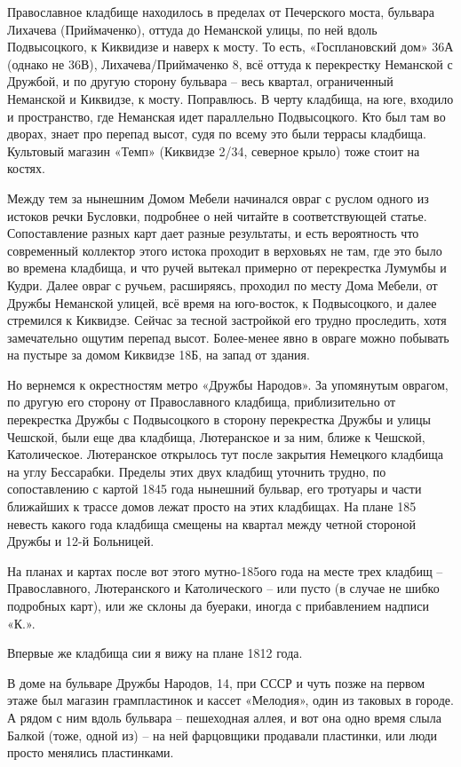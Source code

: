Православное кладбище находилось в пределах от Печерского моста, бульвара Лихачева (Приймаченко), оттуда до Неманской улицы, по ней вдоль Подвысоцкого, к Киквидизе и наверх к мосту. То есть, «Госплановский дом» 36А (однако не 36В), Лихачева/Приймаченко 8, всё оттуда к перекрестку Неманской с Дружбой, и по другую сторону бульвара – весь квартал, ограниченный Неманской и Киквидзе, к мосту. Поправлюсь. В черту кладбища, на юге, входило и пространство, где Неманская идет параллельно Подвысоцкого. Кто был там во дворах, знает про перепад высот, судя по всему это были террасы кладбища. Культовый магазин «Темп» (Киквидзе 2/34, северное крыло) тоже стоит на костях.

Между тем за нынешним Домом Мебели начинался овраг с руслом одного из истоков речки Бусловки, подробнее о ней читайте в соответствующей статье. Сопоставление разных карт дает разные результаты, и есть вероятность что современный коллектор этого истока проходит в верховьях не там, где это было во времена кладбища, и что ручей вытекал примерно от перекрестка Лумумбы и Кудри. Далее овраг с ручьем, расширяясь, проходил по месту Дома Мебели, от Дружбы Неманской улицей, всё время на юго-восток, к Подвысоцкого, и далее стремился к Киквидзе. Сейчас за тесной застройкой его трудно проследить, хотя замечательно ощутим перепад высот. Более-менее явно в овраге можно побывать на пустыре за домом Киквидзе 18Б, на запад от здания.

Но вернемся к окрестностям метро «Дружбы Народов». За упомянутым оврагом, по другую его сторону от Православного кладбища, приблизительно от перекрестка Дружбы с Подвысоцкого в сторону перекрестка Дружбы и улицы Чешской, были еще два кладбища, Лютеранское и за ним, ближе к Чешской, Католическое. Лютеранское открылось тут после закрытия Немецкого кладбища на углу Бессарабки. Пределы этих двух кладбищ уточнить трудно, по сопоставлению с картой 1845 года нынешний бульвар, его тротуары и части ближайших к трассе домов лежат просто на этих кладбищах. На плане 185 невесть какого года кладбища смещены на квартал между четной стороной Дружбы и 12-й Больницей.

На планах и картах после вот этого мутно-185ого года на месте трех кладбищ – Православного, Лютеранского и Католического – или пусто (в случае не шибко подробных карт), или же склоны да буераки, иногда с прибавлением надписи «К.». 

Впервые же кладбища сии я вижу на плане 1812 года.

В доме на бульваре Дружбы Народов, 14, при СССР и чуть позже на первом этаже был магазин грампластинок и кассет «Мелодия», один из таковых в городе. А рядом с ним вдоль бульвара – пешеходная аллея, и вот она одно время слыла Балкой (тоже, одной из) – на ней фарцовщики продавали пластинки, или люди просто менялись пластинками.\\

